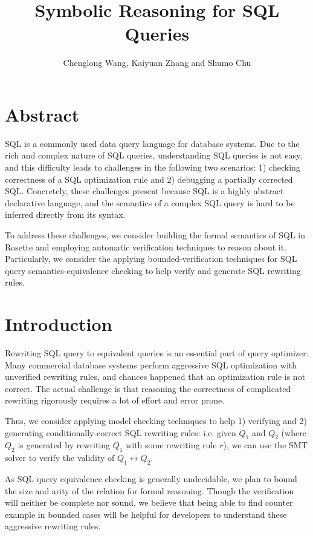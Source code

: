 \documentclass{article}
\begin{document}
\title{Symbolic Reasoning for SQL Queries}
\author{Chenglong Wang, Kaiyuan Zhang and Shumo Chu}
\date{}
\maketitle

\section*{Abstract}
SQL is a commonly used data query language for database systems. Due to the rich and complex nature of SQL queries, understanding SQL queries is not easy, and this difficulty leads to challenges in the following two scenarios: 1) checking correctness of a SQL optimization rule and 2) debugging a partially corrected SQL. Concretely, these challenges present because SQL is a highly abstract declarative language, and the semantics of a complex SQL query is hard to be inferred directly from its syntax.

To address these challenges, we consider building the formal semantics of SQL in Rosette and employing automatic verification techniques to reason about it. Particularly, we consider the applying bounded-verification techniques for SQL query semantics-equivalence checking to help verify and generate SQL rewriting rules.

\section{Introduction}

Rewriting SQL query to equivalent queries is an essential part of query
optimizer. Many commercial database systems perform aggressive SQL optimization with 
unverified rewriting rules, and chances happened that an optimization rule is not correct. 
The actual challenge is that reasoning the correctness of complicated rewriting rigorously 
requires a lot of effort and error prone.

Thus, we consider applying model checking techniques to help 1) verifying and 2) generating conditionally-correct SQL rewriting rules: i.e. 
given $Q_1$ and $Q_2$ (where $Q_2$ is generated by rewriting $Q_1$ with some rewriting rule $r$), we can use the SMT solver to verify the validity of $Q_1 \leftrightarrow Q_2$. 

As SQL query equivalence checking is generally undecidable, we plan to bound the size and arity of the
 relation for formal reasoning. Though the verification will neither be complete nor sound, we believe that being able to find counter example in bounded cases will be helpful for developers to understand these aggressive rewriting rules. 
 
\end{document}
